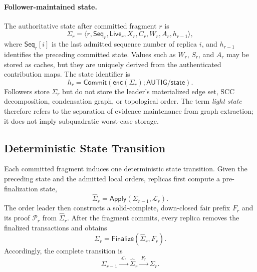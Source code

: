 \paragraph{Follower-maintained state.}
The authoritative state after committed fragment $r$ is
\[
 \Sigma_r=\langle r,\mathsf{Seq}_r,\mathsf{Live}_r,
 X_r,C_r,W_r,A_r,h_{r-1}\rangle,
\]
where $\mathsf{Seq}_r[i]$ is the last admitted sequence number of replica
$i$, and $h_{r-1}$ identifies the preceding committed state. Values such as
$W_r$, $S_r$, and $A_r$ may be stored as caches, but they are uniquely derived
from the authenticated contribution maps. The state identifier is
\[
 h_r=\mathsf{Commit}(\mathsf{enc}(\Sigma_r);\mathsf{AUTIG/state}).
\]
Followers store $\Sigma_r$ but do not store the leader's materialized edge
set, SCC decomposition, condensation graph, or topological order. The term
\emph{light state} therefore refers to the separation of evidence maintenance
from graph extraction; it does not imply subquadratic worst-case storage.

\subsection{Deterministic State Transition}
\label{sec:state-transition}

Each committed fragment induces one deterministic state transition. Given
the preceding state and the admitted local orders, replicas first compute a
pre-finalization state,
\[
 \widehat\Sigma_r=\mathsf{Apply}(\Sigma_{r-1},\mathcal L_r).
\]
The order leader then constructs a solid-complete, down-closed fair prefix
$F_r$ and its proof $\mathcal P_r$ from $\widehat\Sigma_r$. After the
fragment commits, every replica removes the finalized transactions and
obtains
\[
 \Sigma_r=\mathsf{Finalize}(\widehat\Sigma_r,F_r).
\]
Accordingly, the complete transition is
\[
 \Sigma_{r-1}
 \xrightarrow{\;\mathcal L_r\;}
 \widehat\Sigma_r
 \xrightarrow{\;F_r\;}
 \Sigma_r.
\]

